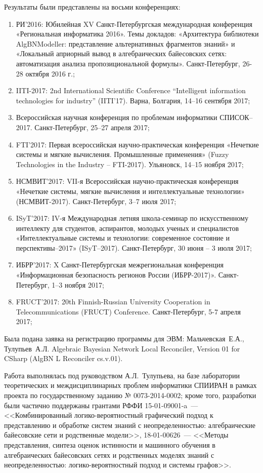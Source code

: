   Результаты были представлены на восьми конференциях: 
  \begin{enumerate}
                \item  РИ’2016: Юбилейная XV Санкт-Петербургская международная конференция «Региональная информатика 2016». Темы докладов: «Архитектура библиотеки AlgBNModeller: представление альтернативных фрагментов знаний» и «Локальный априорный вывод в алгебраических байесовских сетях: автоматизация анализа пропозициональной формулы». Санкт-Петербург, 26-28 октября 2016 г.;
                \item	IITI-2017: 2nd International Scientific Conference “Intelligent infor\-ma\-tion technologies for industry” (IITI’17). Варна, Болгария, 14–16 сентября 2017;
                \item	Всероссийская научная конференция по проблемам информатики СПИСОК–2017. Санкт-Петербург, 25–27 апреля 2017;
                \item	FTI’2017: Первая всероссийская научно-практическая конференция «Нечеткие системы и мягкие вычисления. Промышленные применения» (Fuzzy Technologies in the Industry – FTI-2017). Ульяновск, 14–15 ноября 2017;
                \item	НСМВИТ’2017: VII-я Всероссийская научно-практическая конференция «Нечеткие системы, мягкие вычисления и интеллектуальные технологии» (НСМВИТ-2017). Санкт-Петербург, 3–7 июля 2017;
                \item	ISyT’2017: IV-я Международная летняя школа-семинар по искусственному интеллекту для студентов, аспирантов, молодых ученых и специалистов «Интеллектуальные системы и технологии: современное состояние и перспективы–2017» (ISyT–2017). Санкт-Петербург, 30 июня – 3 июля 2017;
                \item	ИБРР’2017: X Санкт-Петербургская межрегиональная конференция «Информационная безопасность регионов России (ИБРР-2017)». Санкт-Петербург, 1–3 ноября 2017;
                \item   FRUCT’2017: 20th Finnish-Russian University Cooperation in Te\-le\-commu\-ni\-ca\-tions (FRUCT) Conference. Санкт-Петербург, 5-7 апреля 2017;
   \end{enumerate}
    
   Была подана заявка на регистрацию программы для ЭВМ: Мальчевская~Е.А., Тулупьев~А.Л. Algebraic Bayesian Network Local Reconciler, Version 01 for CSharp (AlgBN L Reconciler cs.v.01).

	Работа выполнялась под руководством А.Л.~Тулупьева, на базе лаборатории теоретических и междисциплинарных проблем информатики СПИИРАН в рамках проекта по государственному заданию № 0073-2014-0002; кроме того, разработки были частично поддержаны грантами РФФИ 15-01-09001-a~--- <<Комбинированный логико-ве\-роят\-ност\-ный графический подход к представлению и обработке систем знаний с неопределенностью: алгебраические байесовские сети и родственные модели>>, 18-01-00626~--- <<Методы представления, синтеза оценок истинности и машинного обучения в алгебраических байесовских сетях и родственных моделях знаний с неопределенностью: логико-вероятностный подход и системы графов>>.
    

